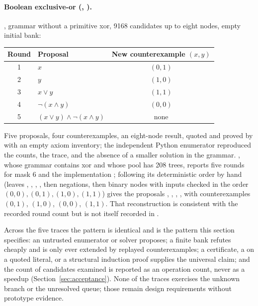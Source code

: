 \paragraph{Boolean exclusive-or (, ).} , grammar without a primitive xor, 9168 candidates up to eight nodes, empty initial bank:
\begin{center}\small
\begin{tabular}{@{}clc@{}}
\toprule
Round & Proposal & New counterexample $(x,y)$ \\
\midrule
1 & $x$ & $(0,1)$ \\
2 & $y$ & $(1,0)$ \\
3 & $x\lor y$ & $(1,1)$ \\
4 & $\neg(x\land y)$ & $(0,0)$ \\
5 & $(x\lor y)\land\neg(x\land y)$ & none \\
\bottomrule
\end{tabular}
\end{center}
Five proposals, four counterexamples, an eight-node result, quoted and proved by  with an empty axiom inventory; the independent Python enumerator reproduced the counts, the trace, and the absence of a smaller solution in the grammar. , whose grammar contains xor and whose pool has 208 trees, reports five rounds for mask 6 and the implementation ; following its deterministic order by hand (leaves , , , , then negations, then binary nodes with inputs checked in the order $(0,0),(0,1),(1,0),(1,1)$) gives the proposals , , , ,  with counterexamples $(0,1)$, $(1,0)$, $(0,0)$, $(1,1)$. That reconstruction is consistent with the recorded round count but is not itself recorded in .

\begin{remark}
Across the five traces the pattern is identical and is the pattern this section specifies: an untrusted enumerator or solver proposes; a finite bank refutes cheaply and is only ever extended by replayed counterexamples; a certificate, a  on a quoted literal, or a structural induction proof supplies the universal claim; and the count of candidates examined is reported as an operation count, never as a speedup (Section~\ref{sec:acceptance}). None of the traces exercises the unknown branch or the unresolved queue; those remain design requirements without prototype evidence.
\end{remark}

